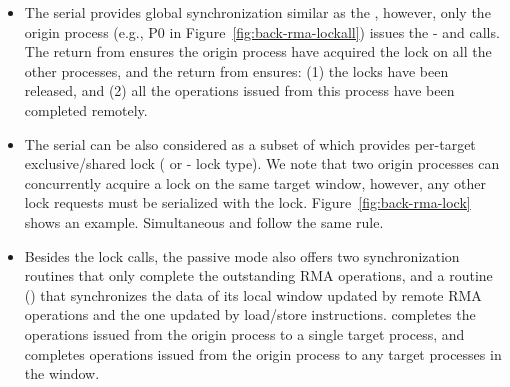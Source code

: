 \begin{itemize}
  \item The  serial provides global synchronization similar
  as the , however, only the origin process (e.g., P0 in
  Figure~\ref{fig:back-rma-lockall}) issues the -
  and  calls. The return from 
  ensures the origin process have acquired the  lock on all
  the other processes, and the return from  ensures:
  (1) the locks have been released, and (2) all the operations issued from
  this process have been completed remotely.

  \item The  serial can be also considered as a subset of 
  which provides per-target exclusive\slash shared lock (
  or - lock type). We note that two origin processes can
  concurrently acquire a  lock on the same target window, however,
  any other lock requests must be serialized with the  lock.
  Figure~\ref{fig:back-rma-lock} shows an example. Simultaneous 
  and  follow the same rule.

  \item Besides the lock calls, the passive mode also offers two 
  synchronization routines that only complete the outstanding RMA operations,
  and a  routine () that synchronizes the data
  of its local window updated by remote RMA operations and the one updated
  by load\slash store instructions.  completes the operations
  issued from the origin process to a single target process, and 
  completes operations issued from the origin process to any target processes
  in the window.
\end{itemize}




